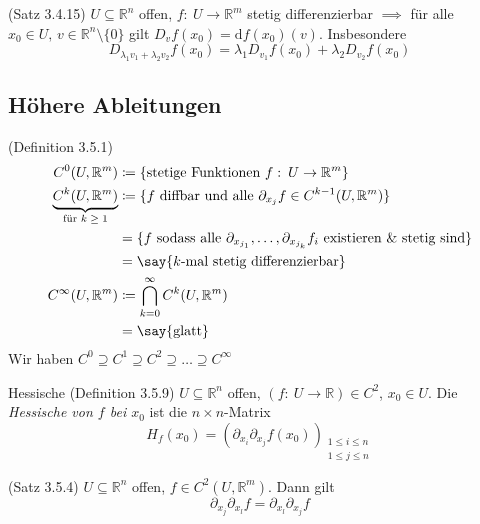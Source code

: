 \documentclass[a4paper,10pt]{article}
\def\R{\mathbb{R}}
\begin{document}
\begin{subbox}{(Satz 3.4.15)}
    \( U \subseteq \R^n \) offen, \( f: \: U \to \R^m \) stetig differenzierbar \( \implies \) für alle \( x_0 \in U, \, v \in \R^n \setminus \{ 0 \} \) gilt \(D_v f(x_0) = \mathrm{d} f(x_0)(v) \). Insbesondere
    \[ D_{\lambda_1 v_1 + \lambda_2 v_2} f(x_0) = \lambda_1 D_{v_1} f(x_0) + \lambda_2 D_{v_2} f(x_0) \]
\end{subbox}


\subsection{Höhere Ableitungen}

\begin{mainbox}{(Definition 3.5.1)}
    \begin{align*}
        C^0(U, \R^m) &\coloneqq \{ \text{stetige Funktionen } f: \: U \to \R^m \} \\
        \underbrace{C^k(U, \R^m)}_\text{für \( k \geq 1 \)} &\coloneqq \{ f \text{ diffbar und alle } \partial_{x_j} f \in C^{k - 1}(U, \R^m) \} \\
        &= \{ f \text{ sodass alle } \partial_{x_{j_1}}, \dots, \partial_{x_{j_k}} f_i \text{ existieren \& stetig sind} \} \\
        &= \text{\say{\( k \)-mal stetig differenzierbar}} \\
        C^\infty(U, \R^m) &\coloneqq \bigcap_{k = 0}^\infty C^k(U, \R^m) \\
        &= \text{\say{glatt}}
    \end{align*}
    Wir haben \( C^0 \supseteq C^1 \supseteq C^2 \supseteq \dots \supseteq C^\infty \)
\end{mainbox}

\begin{mainbox}{Hessische (Definition 3.5.9)}
    \( U \subseteq \R^n \) offen, \( (f: \: U \to \R) \in C^2 \), \( x_0 \in U \). Die \emph{Hessische von \(f \) bei \( x_0 \)} ist die \( n \! \times \! n \)-Matrix
    \[ H_f(x_0) = (\partial_{x_i} \partial_{x_j} f(x_0))_\substack{1 \leq i \leq n \\ 1 \leq j \leq n} \]
\end{mainbox}

\begin{subbox}{(Satz 3.5.4)}
    \( U \subseteq \R^n \) offen, \( f \in C^2(U, \R^m) \). Dann gilt
    \[ \partial_{x_j} \partial_{x_l} f = \partial_{x_l} \partial_{x_j} f \]
\end{subbox}
\end{document}
